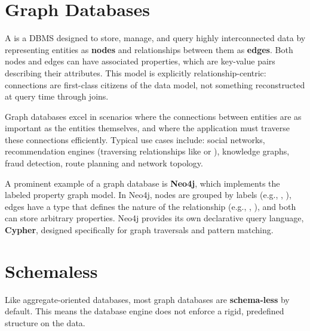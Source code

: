 \section{Graph Databases}
A  is a DBMS designed to store, manage, and query highly interconnected data by representing entities as \textbf{nodes} and relationships between them as \textbf{edges}. Both nodes and edges can have associated properties, which are key-value pairs describing their attributes. This model is explicitly relationship-centric: connections are first-class citizens of the data model, not something reconstructed at query time through joins.

Graph databases excel in scenarios where the connections between entities are as important as the entities themselves, and where the application must traverse these connections efficiently. Typical use cases include: social networks, recommendation engines (traversing relationships like  or ), knowledge graphs, fraud detection, route planning and network topology.

A prominent example of a graph database is \textbf{Neo4j}, which implements the labeled property graph model. In Neo4j, nodes are grouped by labels (e.g., , ), edges have a type that defines the nature of the relationship (e.g., , ), and both can store arbitrary properties. Neo4j provides its own declarative query language, \textbf{Cypher}, designed specifically for graph traversals and pattern matching.

\section{Schemaless}
Like aggregate-oriented databases, most graph databases are \textbf{schema-less} by default. This means the database engine does not enforce a rigid, predefined structure on the data. 

